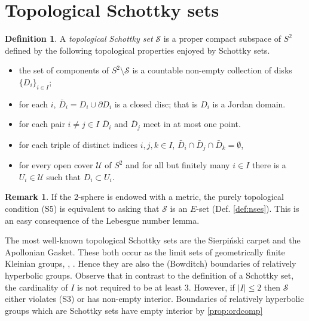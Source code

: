\documentclass[11pt]{article}
\theoremstyle{definition}
\newtheorem{definition}[theorem]{Definition}
\newtheorem{remark}[theorem]{Remark}
\begin{document}
\section{Topological Schottky sets} 
\label{sec:topschott} 

\begin{definition} \label{def:schottky} 
  A {\it topological Schottky set} $\mathcal{S}$ is a proper compact subspace of $S^2$ defined by the following topological properties enjoyed by Schottky sets. 
\begin{itemize}
\item[(S1)] the set of components of $S^2\setminus \mathcal{S}$ is a countable non-empty collection of disks $\{D_i\}_{i\in I}$; 
\item[(S2)] for each $i$, $\bar D_i=D_i\cup\partial D_i$ is a closed disc; that is $D_i$ is a Jordan domain. 
\item[(S3)] for each pair $i\neq j\in I$ $\bar D_i$ and $\bar D_j$ meet in at most 
one point.
\item[(S4)] for each triple of distinct indices $i,j,k\in I$, $\bar D_i\cap \bar D_j \cap \bar D_k=\emptyset$, 
\item[(S5)] for every open cover ${\mathcal{U}}$ of $S^2$ and for all but finitely many $i\in I$ there is a $U_i\in{\mathcal{U}}$ such that $D_i\subset U_i$.
\end{itemize} 
\end{definition} 



\begin{remark}
If the 2-sphere is endowed with a metric, the purely topological condition (S5) is equivalent to asking that 
$\mathcal{S}$ is an $E$-set (Def. \ref{def:nses}). This is an easy consequence of the Lebesgue number lemma. 
\end{remark}


The most well-known topological Schottky sets are the Sierpi\'nski carpet and the Apollonian Gasket.  These both occur as the limit sets of geometrically finite Kleinian groups, \cite{KK}, \cite{HPW}. Hence they are also the (Bowditch) boundaries of relatively hyperbolic groups. 
Observe that in contrast to the definition of a Schottky set, the cardinality of $I$ is not required to be at least $3$. However, if $|I|\le2$ then $\mathcal{S}$ {either violates (S3) or has non-empty interior.  Boundaries of relatively hyperbolic groups which are Schottky sets have empty interior by \ref{prop:ordcomp} }
\end{document}
